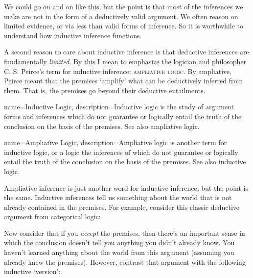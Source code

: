 We could go on and on like this, but the point is that most of the inferences we make are not in the form of a deductively valid argument. We often reason on limited evidence, or via less than valid forms of inference. So it is worthwhile to understand how inductive inference functions.

A second reason to care about inductive inference is that deductive inferences are fundamentally \emph{limited}. By this I mean to emphasize the logician and philosopher C. S. Peirce's term for inductive inference: \textsc{\gls{ampliative logic}}. By ampliative, Peirce meant that the premises `amplify' what can be deductively inferred from them. That is, the premises go beyond their deductive entailments.

{
name=Inductive Logic,
description={Inductive logic is the study of argument forms and inferences which do not guarantee or logically entail the truth of the conclusion on the basis of the premises. See also \gls{ampliative logic}.}
}


{
name=Ampliative Logic,
description={Ampliative logic is another term for inductive logic, or a logic the inferences of which do not guarantee or logically entail the truth of the conclusion on the basis of the premises. See also \gls{inductive logic}.}
}

Ampliative inference is just another word for inductive inference, but the point is the same. Inductive inferences tell us something about the world that is not already contained in the premises. For example, consider this classic deductive argument from categorical logic:

\begin{kormanize}
\end{kormanize}

Now consider that if you \emph{accept} the premises, then there's an important sense in which the conclusion doesn't tell you anything you didn't already know. You haven't learned anything about the world from this argument (assuming you already knew the premises). However, contrast that argument with the following inductive `version':

\begin{kormanize}
\end{kormanize}

